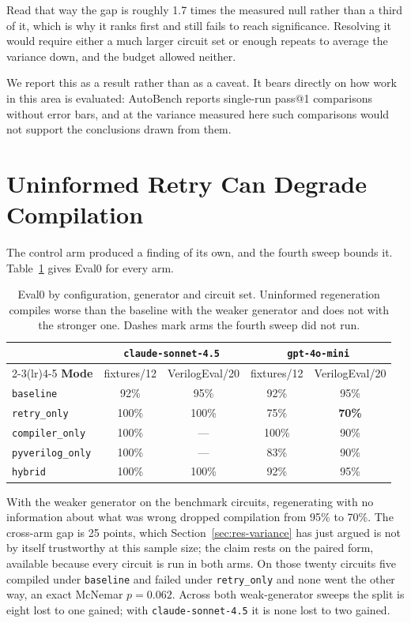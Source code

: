 \documentclass[11pt,a4paper,titlepage=false]{scrreprt}
\begin{document}
Read that way the gap is roughly 1.7 times the measured null rather than a third of it, which
is why it ranks first and still fails to reach significance. Resolving it would
require either a much larger circuit set or enough repeats to average the variance down, and
the budget allowed neither.

We report this as a result rather than as a caveat. It bears directly on how work in this
area is evaluated: AutoBench reports single-run pass@1 comparisons without error bars, and
at the variance measured here such comparisons would not support the conclusions drawn from
them.

\section{Uninformed Retry Can Degrade Compilation}\label{sec:res-retry}

The control arm produced a finding of its own, and the fourth sweep bounds it.
Table~\ref{tab:eval0} gives Eval0 for every arm.

\begin{table}[H]
\centering
\small
\begin{tabular}{@{}l c c c c@{}}
\toprule
 & \multicolumn{2}{c}{\texttt{claude-sonnet-4.5}} & \multicolumn{2}{c}{\texttt{gpt-4o-mini}} \\
\cmidrule(lr){2-3}\cmidrule(lr){4-5}
\textbf{Mode} & fixtures/12 & VerilogEval/20 & fixtures/12 & VerilogEval/20 \\
\midrule
\texttt{baseline}        & 92\%  & 95\%  & 92\%  & 95\% \\
\texttt{retry\_only}     & 100\% & 100\% & 75\%  & \textbf{70\%} \\
\texttt{compiler\_only}  & 100\% & ---   & 100\% & 90\% \\
\texttt{pyverilog\_only} & 100\% & ---   & 83\%  & 90\% \\
\texttt{hybrid}          & 100\% & 100\% & 92\%  & 95\% \\
\bottomrule
\end{tabular}
\caption{Eval0 by configuration, generator and circuit set. Uninformed regeneration compiles
worse than the baseline with the weaker generator and does not with the stronger one. Dashes
mark arms the fourth sweep did not run.}
\label{tab:eval0}
\end{table}

With the weaker generator on the benchmark circuits, regenerating with no information about
what was wrong dropped compilation from 95\% to 70\%. The cross-arm gap is 25 points, which
Section~\ref{sec:res-variance} has just argued is not by itself trustworthy at this sample
size; the claim rests on the paired form, available because every circuit is run in both
arms. On those twenty circuits five compiled under \texttt{baseline} and failed under
\texttt{retry\_only} and none went the other way, an exact McNemar $p=0.062$. Across both
weak-generator sweeps the split is eight lost to one gained; with
\texttt{claude-sonnet-4.5} it is none lost to two gained.
\end{document}
